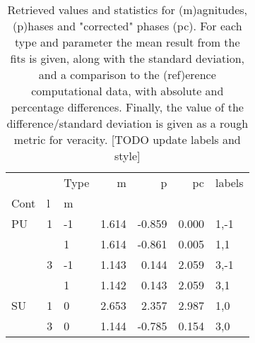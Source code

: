 \begin{table}

\begin{tabular}{lllrrrl}
\toprule
   &   & Type &     m &      p &    pc & labels \\
Cont & l & m &       &        &       &        \\
\midrule
PU & 1 & -1 & 1.614 & -0.859 & 0.000 &   1,-1 \\
   &   &  1 & 1.614 & -0.861 & 0.005 &    1,1 \\
   & 3 & -1 & 1.143 &  0.144 & 2.059 &   3,-1 \\
   &   &  1 & 1.142 &  0.143 & 2.059 &    3,1 \\
SU & 1 &  0 & 2.653 &  2.357 & 2.987 &    1,0 \\
   & 3 &  0 & 1.144 & -0.785 & 0.154 &    3,0 \\
\bottomrule
\end{tabular}

\caption{\label{tab:matE}Retrieved values and statistics for (m)agnitudes, (p)hases and "corrected" phases (pc). For each type and parameter the mean result from the fits is given, along with the standard deviation, and a comparison to the (ref)erence computational data, with absolute and percentage differences. Finally, the value of the difference/standard deviation is given as a rough metric for veracity. [TODO update labels and style]}
\end{table}